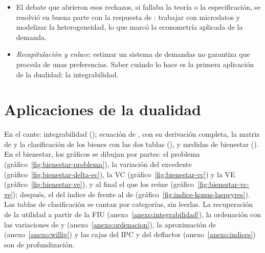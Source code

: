 \documentclass[11pt]{article}
\begin{document}
\begin{itemize}
\begin{enumerate}
\begin{itemize}
    \item con preferencias heterogéneas, las restricciones individuales no tienen por qué cumplirse en la media (teorema de --) ;
    \item de ahí el uso creciente de microdatos;
    \end{itemize}
  \item el \emph{marco estático} y sin incertidumbre: deja fuera los hábitos, los bienes duraderos, las expectativas y las restricciones de liquidez , y el rechazo de la homogeneidad y la simetría puede deberse a ello más que a la irracionalidad de los consumidores.
  \end{enumerate}
\item El debate que abrieron esos rechazos, si fallaba la teoría o la especificación, se resolvió en buena parte con la respuesta de : trabajar con microdatos y modelizar la heterogeneidad, lo que marcó la econometría aplicada de la demanda.
\item \emph{Recapitulación y enlace}: estimar un sistema de demandas no garantiza que proceda de unas preferencias. Saber cuándo lo hace es la primera aplicación de la dualidad: la integrabilidad.
\end{itemize}

\section{Aplicaciones de la dualidad}\label{sec:aplicaciones-dualidad}

\begin{notaopositor}
En el cante: integrabilidad (); ecuación de , con su derivación completa, la matriz de  y la clasificación de los bienes con las dos tablas (), y medidas de bienestar (). En el bienestar, los gráficos se dibujan por partes: el problema (gráfico~\ref{fig:bienestar-problema}), la variación del excedente (gráfico~\ref{fig:bienestar-delta-ec}), la VC (gráfico~\ref{fig:bienestar-vc}) y la VE (gráfico~\ref{fig:bienestar-ve}), y al final el que los reúne (gráfico~\ref{fig:bienestar-vc-ve}); después, el del índice de  frente al de  (gráfico~\ref{fig:indice-konus-laspeyres}). Las tablas de clasificación se cantan por categorías, sin leerlas. La recuperación de la utilidad a partir de la FIU (anexo~\ref{anexo:integrabilidad}), la ordenación con las variaciones de  y  (anexo~\ref{anexo:ordenacion}), la aproximación de  (anexo~\ref{anexo:willig}) y las cajas del IPC y del deflactor (anexo~\ref{anexo:indices}) son de profundización.
\end{notaopositor}
\end{document}
